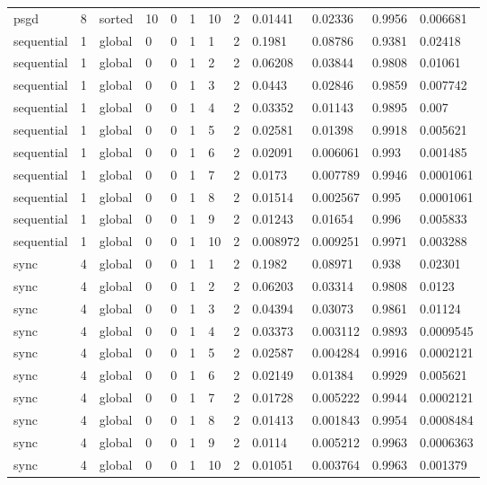 \begin{tabular}{llllllllllll}
psgd & 8 & sorted & 10 & 0 & 1 & 10 & 2 & 0.01441 & 0.02336 & 0.9956 & 0.006681 \\
sequential & 1 & global & 0 & 0 & 1 & 1 & 2 & 0.1981 & 0.08786 & 0.9381 & 0.02418 \\
sequential & 1 & global & 0 & 0 & 1 & 2 & 2 & 0.06208 & 0.03844 & 0.9808 & 0.01061 \\
sequential & 1 & global & 0 & 0 & 1 & 3 & 2 & 0.0443 & 0.02846 & 0.9859 & 0.007742 \\
sequential & 1 & global & 0 & 0 & 1 & 4 & 2 & 0.03352 & 0.01143 & 0.9895 & 0.007 \\
sequential & 1 & global & 0 & 0 & 1 & 5 & 2 & 0.02581 & 0.01398 & 0.9918 & 0.005621 \\
sequential & 1 & global & 0 & 0 & 1 & 6 & 2 & 0.02091 & 0.006061 & 0.993 & 0.001485 \\
sequential & 1 & global & 0 & 0 & 1 & 7 & 2 & 0.0173 & 0.007789 & 0.9946 & 0.0001061 \\
sequential & 1 & global & 0 & 0 & 1 & 8 & 2 & 0.01514 & 0.002567 & 0.995 & 0.0001061 \\
sequential & 1 & global & 0 & 0 & 1 & 9 & 2 & 0.01243 & 0.01654 & 0.996 & 0.005833 \\
sequential & 1 & global & 0 & 0 & 1 & 10 & 2 & 0.008972 & 0.009251 & 0.9971 & 0.003288 \\
sync & 4 & global & 0 & 0 & 1 & 1 & 2 & 0.1982 & 0.08971 & 0.938 & 0.02301 \\
sync & 4 & global & 0 & 0 & 1 & 2 & 2 & 0.06203 & 0.03314 & 0.9808 & 0.0123 \\
sync & 4 & global & 0 & 0 & 1 & 3 & 2 & 0.04394 & 0.03073 & 0.9861 & 0.01124 \\
sync & 4 & global & 0 & 0 & 1 & 4 & 2 & 0.03373 & 0.003112 & 0.9893 & 0.0009545 \\
sync & 4 & global & 0 & 0 & 1 & 5 & 2 & 0.02587 & 0.004284 & 0.9916 & 0.0002121 \\
sync & 4 & global & 0 & 0 & 1 & 6 & 2 & 0.02149 & 0.01384 & 0.9929 & 0.005621 \\
sync & 4 & global & 0 & 0 & 1 & 7 & 2 & 0.01728 & 0.005222 & 0.9944 & 0.0002121 \\
sync & 4 & global & 0 & 0 & 1 & 8 & 2 & 0.01413 & 0.001843 & 0.9954 & 0.0008484 \\
sync & 4 & global & 0 & 0 & 1 & 9 & 2 & 0.0114 & 0.005212 & 0.9963 & 0.0006363 \\
sync & 4 & global & 0 & 0 & 1 & 10 & 2 & 0.01051 & 0.003764 & 0.9963 & 0.001379 \\

\end{tabular}
